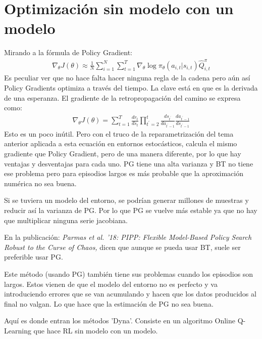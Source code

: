 \section{Optimización sin modelo con un modelo}%
\label{sec:optimización_sin_modelo_con_un_modelo}

Mirando a la fórmula de Policy Gradient:
\begin{align}
\nabla _ { \theta } J ( \theta ) \approx \frac { 1 } { N } \sum _ { i = 1 } ^ { N } \sum _ { t = 1 } ^ { T } \nabla _ { \theta } \operatorname { log } \pi _ { \theta } ( a _ { i , t } | s _ { i , t } ) \hat { Q } _ { i , t } ^ { \pi }
\end{align}
Es peculiar ver que no hace falta hacer ninguna regla de la cadena pero aún así Policy Gradients
optimiza a través del tiempo. La clave está en que es la derivada de una esperanza. El
gradiente de la retropropagación del camino se expresa como:
\begin{align}
\nabla _ { \theta } J ( \theta ) = \sum _ { t = 1 } ^ { T } \frac { d r _ { t } } { d s _ { t } } \prod _ { t ^ { \prime } = 2 } ^ { t } \frac { d s _ { t ^ { \prime } } } { d a _ { t ^ { \prime } - 1 } } \frac { d a _ { t ^ { \prime } - 1 } } { d s _ { t ^ { \prime } - 1 } }
\end{align}
Esto es un poco inútil. Pero con el truco de la reparametrización del tema anterior aplicada a
esta ecuación en entornos estocásticos, calcula el mismo gradiente que Policy Gradient,
pero de una manera diferente, por lo que hay ventajas y desventajas para cada uno. PG tiene
una alta varianza y BT no tiene ese problema pero para episodios largos es más probable que la
aproximación numérica no sea buena. 

Si se tuviera un modelo del entorno, se podrían generar millones de muestras y reducir así la
varianza de PG. Por lo que PG se vuelve más estable ya que no hay que multiplicar ninguna
serie jacobiana.

En la publicación: 
\textit{ Parmas et al. '18: PIPP: Flexible Model-Based Policy Search Robust to the Curse of Chaos, }
dicen que aunque se pueda usar BT, suele ser preferible usar PG.

Este método (usando PG) también tiene sus problemas cuando los episodios son largos. Estos vienen
de que el modelo del entorno no es perfecto y va introduciendo errores que se van acumulando y
hacen que los datos producidos al final no valgan. Lo que hace que la estimación de PG no
sea buena.

Aquí es donde entran los métodos 'Dyna'. Consiste en un algoritmo Online Q-Learning que hace RL
sin modelo con un modelo.

